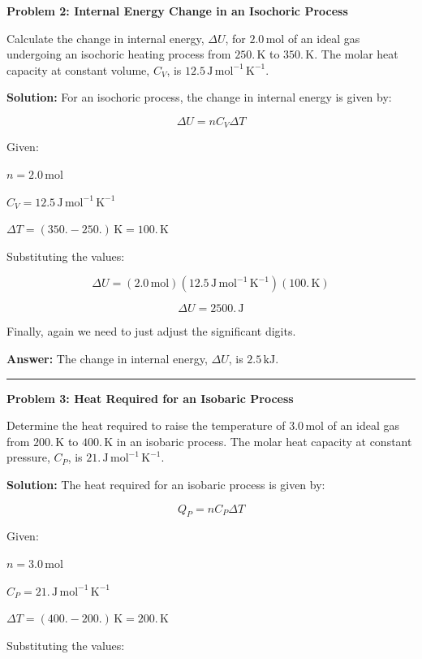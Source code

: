 \documentclass[
  9pt,
]{extbook}
\theoremstyle{definition}
\theoremstyle{definition}
\theoremstyle{definition}
\theoremstyle{definition}
\theoremstyle{remark}
\begin{document}
\textbf{Problem 2: Internal Energy Change in an Isochoric Process}

Calculate the change in internal energy, \(\Delta U\), for \(2.0 \, \text{mol}\) of an ideal gas undergoing an isochoric heating process from \(250. \, \text{K}\) to \(350. \, \text{K}\). The molar heat capacity at constant volume, \(C_V\), is \(12.5 \, \text{J} \, \text{mol}^{-1} \, \text{K}^{-1}\).

\textbf{Solution:} For an isochoric process, the change in internal energy is given by:

\[ \Delta U = n C_V \Delta T \]

Given:

\(n = 2.0 \, \text{mol}\)

\(C_V = 12.5 \, \text{J} \, \text{mol}^{-1} \, \text{K}^{-1}\)

\(\Delta T = (350. - 250.) \, \text{K} = 100. \, \text{K}\)

Substituting the values:

\[ \Delta U = (2.0\, \text{mol})(12.5\, \text{J} \, \text{mol}^{-1} \, \text{K}^{-1}) (100.\,\text{K}) \]

\[ \Delta U = 2500. \, \text{J} \]

Finally, again we need to just adjust the significant digits.

\textbf{Answer:} The change in internal energy, \(\Delta U\), is \(2.5 \, \text{kJ}\).

\begin{center}\rule{0.5\linewidth}{0.5pt}\end{center}

\textbf{Problem 3: Heat Required for an Isobaric Process}

Determine the heat required to raise the temperature of \(3.0 \, \text{mol}\) of an ideal gas from \(200. \, \text{K}\) to \(400. \, \text{K}\) in an isobaric process. The molar heat capacity at constant pressure, \(C_P\), is \(21. \, \text{J} \, \text{mol}^{-1} \, \text{K}^{-1}\).

\textbf{Solution:} The heat required for an isobaric process is given by:

\[ Q_P = n C_P \Delta T \]

Given:

\(n = 3.0 \, \text{mol}\)

\(C_P = 21. \, \text{J} \, \text{mol}^{-1} \, \text{K}^{-1}\)

\(\Delta T = (400. - 200.) \, \text{K} = 200. \, \text{K}\)

Substituting the values:
\end{document}
